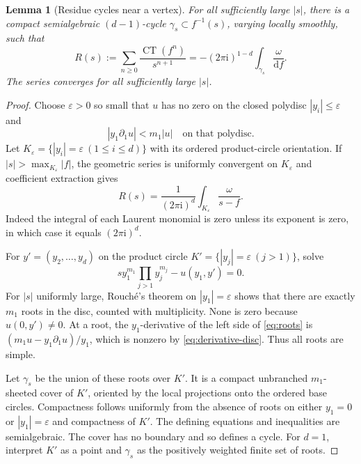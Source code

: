 \documentclass[11pt]{article}
\numberwithin{equation}{section}
\newtheorem{lemma}[theorem]{Lemma}
\theoremstyle{definition}
\theoremstyle{remark}
\newcommand{\CT}{\operatorname{CT}}
\newcommand{\dd}{\mathrm d}
\newcommand{\ii}{\mathrm i}
\begin{document}
\begin{lemma}[Residue cycles near a vertex]\label{lem:residue}
For all sufficiently large $|s|$, there is a compact semialgebraic
$(d-1)$-cycle $\gamma_s\subset f^{-1}(s)$, varying locally smoothly,
such that
\begin{equation}\label{eq:residue-identity}
 R(s):=\sum_{n\ge0}\frac{\CT(f^n)}{s^{n+1}}
       =-(2\pi\ii)^{1-d}\int_{\gamma_s}\frac{\omega}{\dd f}.
\end{equation}
The series converges for all sufficiently large $|s|$.
\end{lemma}
\begin{proof}
Choose $\varepsilon>0$ so small that $u$ has no zero on the closed
polydisc $|y_i|\le\varepsilon$ and
\begin{equation}\label{eq:derivative-disc}
 |y_1\partial_1u|<m_1|u|
 \quad\text{on that polydisc}.
\end{equation}
Let $K_\varepsilon=\{|y_i|=\varepsilon\ (1\le i\le d)\}$ with its
ordered product-circle orientation. If
$|s|>\max_{K_\varepsilon}|f|$, the geometric series is uniformly
convergent on $K_\varepsilon$ and coefficient extraction gives
\begin{equation}\label{eq:cauchy-transform}
 R(s)=\frac1{(2\pi\ii)^d}
       \int_{K_\varepsilon}\frac{\omega}{s-f}.
\end{equation}
Indeed the integral of each Laurent monomial is zero unless its exponent
is zero, in which case it equals $(2\pi\ii)^d$.

For $y'=(y_2,\ldots,y_d)$ on the product circle
$K'=\{|y_j|=\varepsilon\ (j>1)\}$, solve
\begin{equation}\label{eq:roots}
 s y_1^{m_1}\prod_{j>1}y_j^{m_j}-u(y_1,y')=0.
\end{equation}
For $|s|$ uniformly large, Rouch\'e's theorem on $|y_1|=\varepsilon$
shows that there are exactly $m_1$ roots in the disc, counted with
multiplicity. None is zero because $u(0,y')\ne0$. At a root, the
$y_1$-derivative of the left side of \eqref{eq:roots} is
$(m_1u-y_1\partial_1u)/y_1$, which is nonzero by
\eqref{eq:derivative-disc}. Thus all roots are simple.

Let $\gamma_s$ be the union of these roots over $K'$. It is a compact
unbranched $m_1$-sheeted cover of $K'$, oriented by the local projections
onto the ordered base circles. Compactness follows uniformly from the
absence of roots on either $y_1=0$ or $|y_1|=\varepsilon$ and compactness
of $K'$. The defining equations and inequalities are semialgebraic.
The cover has no boundary and so defines a cycle. For $d=1$, interpret
$K'$ as a point and $\gamma_s$ as the positively weighted finite set of
roots.


\end{proof}
\end{document}
